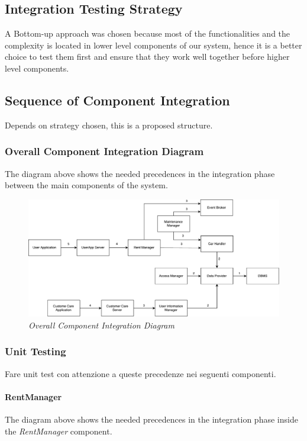 \subsection{Integration Testing Strategy}
A Bottom-up approach was chosen because most of the functionalities and the complexity is located in lower level components of our system, hence it is a better choice to test them first and ensure that they work well together before higher level components.

\subsection{Sequence of Component Integration}
Depends on strategy chosen, this is a proposed structure.

\subsubsection{Overall Component Integration Diagram} 
The diagram above shows the needed precedences in the integration phase between the main components of the system.

	\begin{figure}[h]
			\centering
			\includegraphics[width=\linewidth]{img/overallIntegration}
			\caption{
				\label{fig:overallIntegration} 
				\emph{Overall Component Integration Diagram}
			}
		\end{figure}

\clearpage

\subsubsection{Unit Testing} 
Fare unit test con attenzione a queste precedenze nei seguenti componenti.

\paragraph{RentManager} 
The diagram above shows the needed precedences in the integration phase inside the \emph{RentManager} component.
